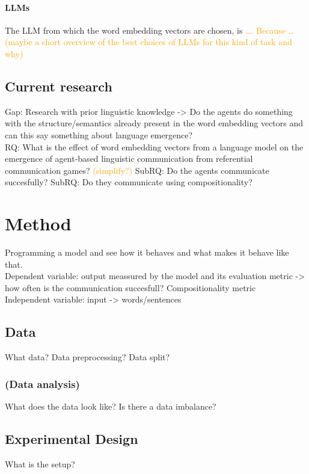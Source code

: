 \documentclass[a4paper, 12pt]{report}
\begin{document}
\subsubsection{LLMs}
The LLM from which the word embedding vectors are chosen, is \textcolor{orange}{\dots. Because \dots (maybe a short overview of the best choices of LLMs for this kind of task and why)}

\section{Current research}
Gap: Research with prior linguistic knowledge -> Do the agents do something with the structure/semantics already present in the word embedding vectors and can this say something about language emergence? \\
RQ: What is the effect of word embedding vectors from a language model on the emergence of agent-based linguistic communication from referential communication games? \textcolor{orange}{(simplify?)}
SubRQ: Do the agents communicate succesfully?
SubRQ: Do they communicate using compositionality?


\chapter{Method}
Programming a model and see how it behaves and what makes it behave like that. \\
Dependent variable: output meassured by the model and its evaluation metric -> how often is the communication succesfull? Compositionality metric \\
Independent variable: input -> words/sentences \\

\section{Data}
What data? Data preprocessing? Data split?

\subsection{(Data analysis)}
What does the data look like? Is there a data imbalance?

\section{Experimental Design}
What is the setup?
\end{document}
